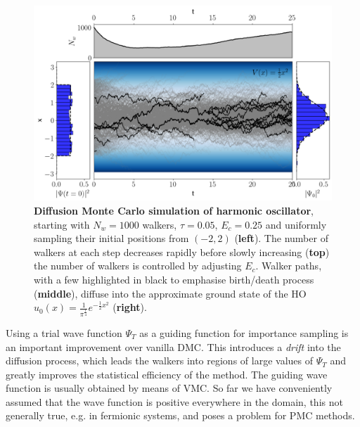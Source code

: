 \begin{figure}[h]
	\centering
	\includegraphics[width=\linewidth]{Chapter2/Figs/Raster/dmc.png}
	\caption[DMC simulation of harmonic oscillator]{\textbf{Diffusion Monte Carlo simulation of harmonic oscillator}, starting with $N_w=1000$ walkers, $\tau=0.05$, $E_c=0.25$ and uniformly sampling their initial positions from $(-2, 2)$ (\textbf{left}). The number of walkers at each step decreases rapidly before slowly increasing (\textbf{top}) the number of walkers is controlled by adjusting $E_c$. Walker paths, with a few highlighted in black to emphasise birth/death process (\textbf{middle}), diffuse into the approximate ground state of the HO $u_0(x) = \frac{1}{\pi^{\frac{1}{4}}}e^{-\frac{1}{2}x^2}$ (\textbf{right}).}
	\label{fig:dmc}
\end{figure}
Using a trial wave function $\Psi_T$ as a guiding function for importance sampling is an important improvement over vanilla DMC. This introduces a \emph{drift} into the diffusion process, which leads the walkers into regions of large values of $\Psi_T$ and greatly improves the statistical efficiency of the method. The guiding wave function is usually obtained by means of VMC. So far we have conveniently assumed that the wave function is positive everywhere in the domain, this not generally true, e.g. in fermionic systems, and poses a problem for PMC methods.

